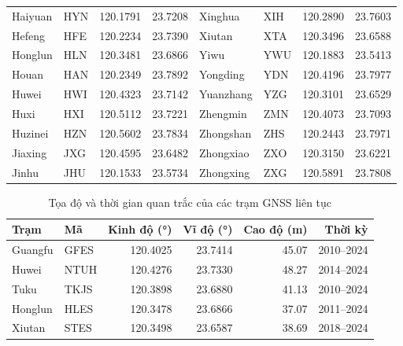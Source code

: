 \begin{table}[htbp]
\begin{tabular}{llcc|llcc}
		Haiyuan & HYN & 120.1791 & 23.7208 & Xinghua & XIH & 120.2890 & 23.7603 \\
		Hefeng & HFE & 120.2234 & 23.7390 & Xiutan & XTA & 120.3496 & 23.6588 \\
		Honglun & HLN & 120.3481 & 23.6866 & Yiwu & YWU & 120.1883 & 23.5413 \\
		Houan & HAN & 120.2349 & 23.7892 & Yongding & YDN & 120.4196 & 23.7977 \\
		Huwei & HWI & 120.4323 & 23.7142 & Yuanzhang & YZG & 120.3101 & 23.6529 \\
		Huxi & HXI & 120.5112 & 23.7221 & Zhengmin & ZMN & 120.4073 & 23.7093 \\
		Huzinei & HZN & 120.5602 & 23.7834 & Zhongshan & ZHS & 120.2443 & 23.7971 \\
		Jiaxing & JXG & 120.4595 & 23.6482 & Zhongxiao & ZXO & 120.3150 & 23.6221 \\
		Jinhu & JHU & 120.1533 & 23.5734 & Zhongxing & ZXG & 120.5891 & 23.7808 \\
		\bottomrule
	\end{tabular}
\end{table}

\begin{table}[htbp]
	\centering
	\caption{Tọa độ và thời gian quan trắc của các trạm GNSS liên tục}
	\label{tab:gnss_info}
	\begin{tabular}{llrrrr}
		\toprule
		\textbf{Trạm} & \textbf{Mã} & \textbf{Kinh độ (\si{\degree})} & \textbf{Vĩ độ (\si{\degree})} & \textbf{Cao độ (m)} & \textbf{Thời kỳ} \\
		\midrule
		Guangfu  & GFES & 120.4025 & 23.7414 & 45.07 & 2010--2024 \\
		Huwei    & NTUH & 120.4276 & 23.7330 & 48.27 & 2014--2024 \\
		Tuku     & TKJS & 120.3898 & 23.6880 & 41.13 & 2010--2024 \\
		Honglun  & HLES & 120.3478 & 23.6866 & 37.07 & 2011--2024 \\
		Xiutan   & STES & 120.3498 & 23.6587 & 38.69 & 2018--2024 \\
		\bottomrule
	\end{tabular}
\end{table}

